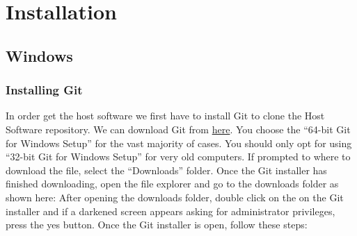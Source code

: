 \documentclass[12pt]{article}
\begin{document}

\tableofcontents
\newpage
\section{Installation}
\subsection{Windows}
\subsubsection{Installing Git}
In order get the host software we first have to install Git to clone the Host Software repository. We can download Git from \href{https://git-scm.com/download/win}{here}. You choose the ``64-bit Git for Windows Setup'' for the vast majority of cases. You should only opt for using ``32-bit Git for Windows Setup'' for very old computers. If prompted to where to download the file, select the ``Downloads'' folder. Once the Git installer has finished downloading, open the file explorer and go to the downloads folder as shown here:
After opening the downloads folder, double click on the on the Git installer and if a darkened screen appears asking for administrator privileges, press the yes button. Once the Git installer is open, follow these steps:
\end{document}
